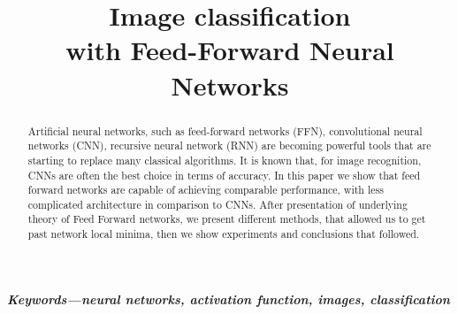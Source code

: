 \documentclass[conference]{IEEEtran}
\providecommand{\keywords}[1]{\textbf{\textit{Keywords---#1}}}
\begin{document}
	\title{Image classification \\ with Feed-Forward Neural Networks}
	
	\author{}

   

	
	\maketitle
	
	
	\begin{abstract}
	
	Artificial neural networks, such as feed-forward networks (FFN), convolutional neural networks (CNN), recursive neural network (RNN) are becoming powerful tools that are starting to replace many classical algorithms. It is known that, for image recognition, CNNs are often the best choice in terms of accuracy. In this paper we show that feed forward networks are capable of achieving comparable performance, with less complicated architecture in comparison to CNNs. After presentation of underlying theory of Feed Forward networks, we present different methods, that allowed us to get past network local minima, then we show experiments and conclusions that followed.
	
	
	\end{abstract}
	
	\vspace{5pt}
	\keywords{neural networks, activation function, images, classification}
	
\end{document}
